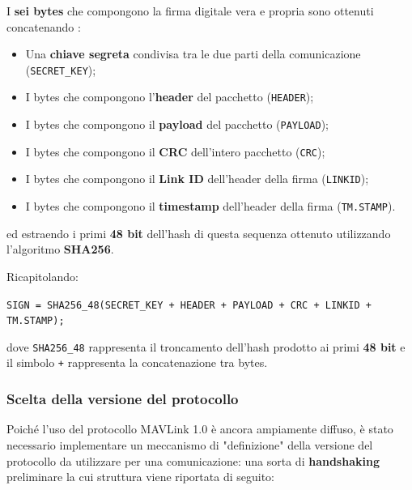 \documentclass[a4paper, 12pt, oneside]{article}
\begin{document}
I \textbf{sei bytes} che compongono la firma digitale vera e propria sono ottenuti concatenando \cite{sign-algorithm}:

\begin{itemize}
    \item Una \textbf{chiave segreta} condivisa tra le due parti della comunicazione (\texttt{SECRET\_KEY});
    \item I bytes che compongono l'\textbf{header} del pacchetto (\texttt{HEADER});
    \item I bytes che compongono il \textbf{payload} del pacchetto (\texttt{PAYLOAD});
    \item I bytes che compongono il \textbf{CRC} dell'intero pacchetto (\texttt{CRC});
    \item I bytes che compongono il \textbf{Link ID} dell'header della firma (\texttt{LINKID});
    \item I bytes che compongono il \textbf{timestamp} dell'header della firma (\texttt{TM.STAMP}).
\end{itemize}

ed estraendo i primi \textbf{48 bit} dell'hash di questa sequenza ottenuto utilizzando l'algoritmo \textbf{SHA256}.

Ricapitolando:

\begin{center}
    \texttt{SIGN = SHA256\_48(SECRET\_KEY + HEADER + PAYLOAD + CRC + LINKID + TM.STAMP);}
\end{center}

dove \texttt{SHA256\_48} rappresenta il troncamento dell'hash prodotto ai primi \textbf{48 bit} e il simbolo \texttt{+} rappresenta la concatenazione tra bytes.

\newpage
\subsubsection{Scelta della versione del protocollo}
Poiché l'uso del protocollo MAVLink 1.0 è ancora ampiamente diffuso, è stato necessario implementare un meccanismo di "definizione" della versione del protocollo da utilizzare per una comunicazione: una sorta di \textbf{handshaking} \cite{version-handshaking} preliminare la cui struttura viene riportata di seguito:
\end{document}
